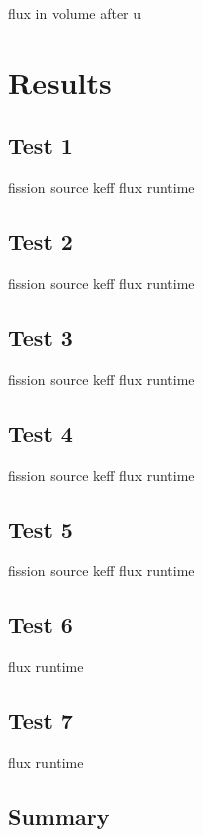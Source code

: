 \documentclass[preprint,12pt]{elsarticle}
\begin{document}
flux in volume after u


\section{Results}
\label{sec:results}

\subsection{Test 1}

fission source
keff
flux
runtime

\subsection{Test 2}

fission source
keff
flux
runtime

\subsection{Test 3}

fission source
keff
flux
runtime

\subsection{Test 4}

fission source
keff
flux
runtime

\subsection{Test 5}

fission source
keff
flux
runtime

\subsection{Test 6}

flux
runtime

\subsection{Test 7}

flux
runtime

\subsection{Summary}
\end{document}
